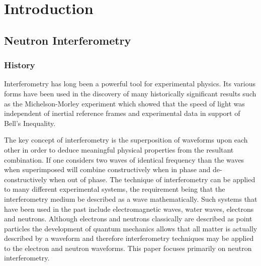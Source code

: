
\chapter{Introduction} %
\label{Chapter1}


\section{Neutron Interferometry}
\subsection{History}
Interferometry has long been a powerful tool for experimental physics. Its various forms have been used in the discovery of many historically significant results such as the Michelson-Morley experiment which showed that the speed of light was independent of inertial reference frames and experimental data in support of Bell's Inequality. \cite{michelson_morley}\cite{bells_inequality}

The key concept of interferometry is the superposition of waveforms upon each other in order to deduce meaningful physical properties from the resultant combination. If one considers two waves of identical frequency than the waves when superimposed will combine constructively when in phase and de-constructively when out of phase. The technique of interferometry can be applied to many different experimental systems, the requirement being that the interferometry medium be described as a wave mathematically. Such systems that have been used in the past include electromagnetic waves, water waves, electrons and neutrons. Although electrons and neutrons classically are described as point particles the development of quantum mechanics allows that all matter is actually described by a waveform and therefore interferometry techniques may be applied to the electron and neutron waveforms. This paper focuses primarily on neutron interferometry. 

